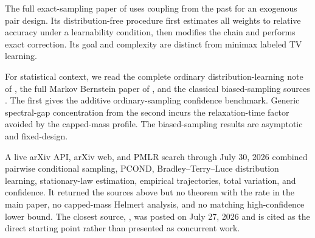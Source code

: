 \documentclass{article}
\begin{document}
The full exact-sampling paper of \citet{fotakis2022perfect} uses coupling
from the past for an exogenous pair design. Its distribution-free procedure
first estimates all weights to relative accuracy under a learnability
condition, then modifies the chain and performs exact correction. Its goal
and complexity are distinct from minimax labeled TV learning.

For statistical context, we read the complete ordinary distribution-learning
note of \citet{canonne2020short}, the full Markov Bernstein paper of
\citet{jiang2018bernstein}, and the classical biased-sampling sources
\citep{vardi1985empirical,gill1988large}. The first gives the additive
ordinary-sampling confidence benchmark. Generic spectral-gap concentration
from the second incurs the relaxation-time factor avoided by the capped-mass
profile. The biased-sampling results are asymptotic and fixed-design.

A live arXiv API, arXiv web, and PMLR search through July 30, 2026 combined
pairwise conditional sampling, PCOND, Bradley--Terry--Luce distribution
learning, stationary-law estimation, empirical trajectories, total
variation, and confidence. It returned the sources above but no theorem with
the rate in the main paper, no capped-mass Helmert analysis, and no matching
high-confidence lower bound. The closest source,
\citet{kleinberg2026providers}, was posted on July 27, 2026 and is cited as
the direct starting point rather than presented as concurrent work.


\end{document}
